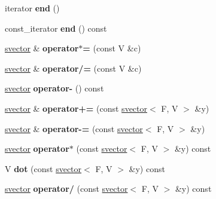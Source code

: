 \begin{DoxyCompactItemize}
\item 
\hypertarget{classsvector_a35b2c7f05af13cb957af871cedcc5e00}{
iterator {\bfseries end} ()}
\label{classsvector_a35b2c7f05af13cb957af871cedcc5e00}

\item 
\hypertarget{classsvector_ad40a20f476d65891c06db88f7b43c12e}{
const\_\-iterator {\bfseries end} () const }
\label{classsvector_ad40a20f476d65891c06db88f7b43c12e}

\item 
\hypertarget{classsvector_a6dad0388185b81076751d6dad78e3fbf}{
\hyperlink{classsvector}{svector} \& {\bfseries operator$\ast$=} (const V \&c)}
\label{classsvector_a6dad0388185b81076751d6dad78e3fbf}

\item 
\hypertarget{classsvector_a5cffef009f0233103409edd38d658d11}{
\hyperlink{classsvector}{svector} \& {\bfseries operator/=} (const V \&c)}
\label{classsvector_a5cffef009f0233103409edd38d658d11}

\item 
\hypertarget{classsvector_aea1f3107cc825f39969674dbe609a12a}{
\hyperlink{classsvector}{svector} {\bfseries operator-\/} () const }
\label{classsvector_aea1f3107cc825f39969674dbe609a12a}

\item 
\hypertarget{classsvector_a5420004342894baf43b5811f8a49dd22}{
\hyperlink{classsvector}{svector} \& {\bfseries operator+=} (const \hyperlink{classsvector}{svector}$<$ F, V $>$ \&y)}
\label{classsvector_a5420004342894baf43b5811f8a49dd22}

\item 
\hypertarget{classsvector_a141a4f013fb63eb81bf297c048a0e133}{
\hyperlink{classsvector}{svector} \& {\bfseries operator-\/=} (const \hyperlink{classsvector}{svector}$<$ F, V $>$ \&y)}
\label{classsvector_a141a4f013fb63eb81bf297c048a0e133}

\item 
\hypertarget{classsvector_a71e1ccf9f794dcc7ec2cf749bdcd2e23}{
\hyperlink{classsvector}{svector} {\bfseries operator$\ast$} (const \hyperlink{classsvector}{svector}$<$ F, V $>$ \&y) const }
\label{classsvector_a71e1ccf9f794dcc7ec2cf749bdcd2e23}

\item 
\hypertarget{classsvector_a0a5aaef6f64ca6a66e25880b445b3057}{
V {\bfseries dot} (const \hyperlink{classsvector}{svector}$<$ F, V $>$ \&y) const }
\label{classsvector_a0a5aaef6f64ca6a66e25880b445b3057}

\item 
\hypertarget{classsvector_ac72bf8a1d29510edec5e19220733d708}{
\hyperlink{classsvector}{svector} {\bfseries operator/} (const \hyperlink{classsvector}{svector}$<$ F, V $>$ \&y) const }
\label{classsvector_ac72bf8a1d29510edec5e19220733d708}


\end{DoxyCompactItemize}

